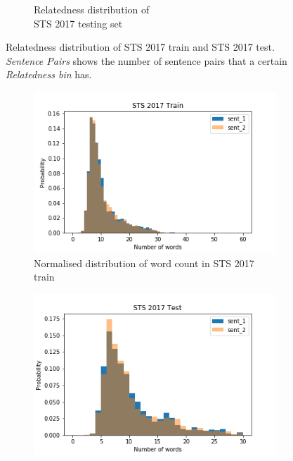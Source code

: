 \begin{enumerate}
\begin{figure}
\begin{subfigure}[b]{.5\textwidth}
		\caption{Relatedness distribution of \\ STS 2017 testing set}
		\label{fig:sts_test_relatedness}
	\end{subfigure}
	\caption[Relatedness distribution of STS 2017 train and STS 2017 test]{Relatedness distribution of STS 2017 train and STS 2017 test. \textit{Sentence Pairs} shows the number of sentence pairs that a certain \textit{Relatedness bin} has.}
	\label{fig:sts_relatedness}
\end{figure}


\begin{figure}
	\captionsetup[subfigure]{justification=centering}
	\centering
	\begin{subfigure}[b]{.5\textwidth}
		\centering
		\includegraphics[width=\textwidth]{figures/semantic_textual_similarity/introduction/sts_2017_train_words.png}
		\caption{Normalised distribution of word count in STS 2017 train}
		\label{fig:sts_train_words}
	\end{subfigure}%
	\begin{subfigure}[b]{.5\textwidth}
		\centering
		\includegraphics[width=\textwidth]{figures/semantic_textual_similarity/introduction/sts_2017_test_words.png}

\end{subfigure}
\end{figure}
\end{enumerate}

